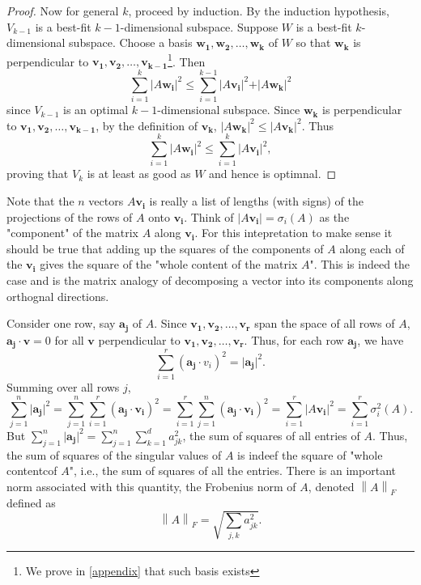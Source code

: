 \begin{proof}
    Now for general \(k\), proceed by induction. By the induction hypothesis, \(V_{k-1}\) is a best-fit \(k-1\)-dimensional subspace. Suppose \(W\) is a best-fit \(k\)-dimensional subspace. Choose a basis \(\mathbf{w_1}, \mathbf{w_2}, \dots , \mathbf{w_k} \) of \(W\) so that \(\mathbf{w_k} \) is perpendicular to \(\mathbf{v_1}, \mathbf{v_2}, \dots , \mathbf{v_{k-1}} \)\footnote{We prove in \autoref{appendix} that such basis exists}. Then
    \[
      \sum_{i=1}^{k} \vert A \mathbf{w_i}  \vert^2 \le  \sum_{i=1}^{k-1} \vert A \mathbf{v_i}  \vert^2  + \vert A \mathbf{w_k}  \vert^2 
    \]  
    since \(V_{k-1}\) is an optimal \(k-1\)-dimensional subspace. Since \(\mathbf{w_k} \) is perpendicular to \(\mathbf{v_1}, \mathbf{v_2}, \dots , \mathbf{v_{k-1}}   \), by the definition of \(\mathbf{v_k} \), \( \vert A \mathbf{w_k} \vert^2 \le \vert A \mathbf{v_k} \vert^2  \). Thus
    \[
     \sum_{i=1}^{k} \vert A \mathbf{w_i}  \vert^2 \le  \sum_{i=1}^{k} \vert A \mathbf{v_i}  \vert^2 ,
    \]   
    proving that \(V_k\) is at least as good as \(W\) and hence is optimnal. 
\end{proof}

\begin{note}
  Note that the \(n\) vectors \(A \mathbf{v_i} \) is really a list of lengths (with signs) of the projections of the rows of \(A\) onto \(\mathbf{v_i} \). Think of \(\vert A \mathbf{v_i} \vert = \sigma _i (A)   \) as the "component" of the matrix \(A\) along \(\mathbf{v_i} \). For this intepretation to make sense it should be true that adding up the squares of the components of \(A\) along each of the \(\mathbf{v_i} \) gives the square of the "whole content of the matrix \(A\)". This is indeed the case and is the matrix analogy of decomposing a vector into its components along orthognal directions.     
\end{note}

Consider one row, say \(\mathbf{a_j} \) of \(A\). Since \(\mathbf{v_1}, \mathbf{v_2}, \dots , \mathbf{v_r}   \) span the space of all rows of \(A\), \(\mathbf{a_j} \cdot \mathbf{v} = 0 \) for all \(\mathbf{v} \) perpendicular to \(\mathbf{v_1}, \mathbf{v_2}, \dots  , \mathbf{v_r} \). Thus, for each row \(\mathbf{a_j} \), we have
\[
  \sum_{i=1}^{r} (\mathbf{a_j} \cdot v_i )^2= \vert \mathbf{a_j}  \vert^2.  
\]       
Summing over all rows \(j\), 
\[
  \sum_{j=1}^{n} \vert \mathbf{a_j}  \vert^2 = \sum_{j=1}^{n} \sum_{i=1}^{r} (\mathbf{a_j} \cdot \mathbf{v_i} )^2 =  \sum_{i=1}^{r} \sum_{j=1}^{n} (\mathbf{a_j} \cdot \mathbf{v_i}  )^2 = \sum_{i=1}^{r} \vert A \mathbf{v_i}  \vert^2 = \sum_{i=1}^{r} \sigma _i^2(A).   
\] 
But \(\sum_{j=1}^{n} \vert \mathbf{a_j}  \vert^2 = \sum_{j=1}^{n} \sum_{k=1}^{d} a_{jk}^2  \), the sum of squares of all entries of \(A\). Thus, the sum of squares of the singular values of \(A\) is indeef the square of "whole contentcof \(A\)", i.e., the sum of squares of all the entries. There is an important norm associated with this quantity, the Frobenius norm of \(A\), denoted \(\left\lVert A \right\rVert _F \)  defined as 
\[
  \left\lVert A \right\rVert _F = \sqrt{\sum_{j,k} a_{jk}^2}.  
\]    

